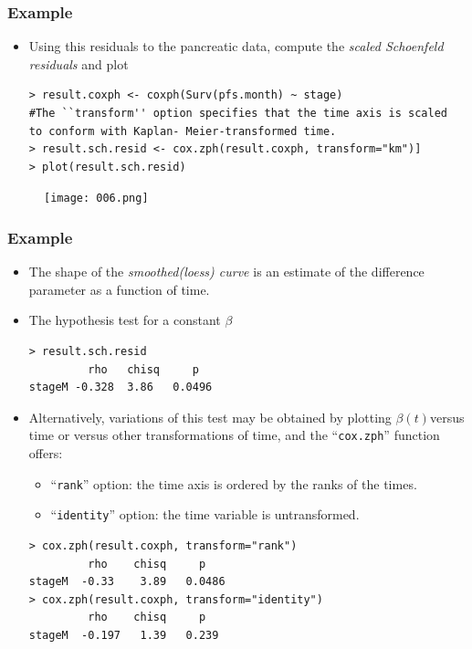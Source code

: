 \documentclass{beamer}
\newcommand{\empr}[1]{{\emph{\color{red}#1}}}
\begin{document}
\pagebreak
\begin{frame}[fragile]
\frametitle{Example}
\begin{itemize}
\item Using this residuals to the pancreatic data, compute the \empr{scaled Schoenfeld residuals} and plot
\begin{Verbatim}
> result.coxph <- coxph(Surv(pfs.month) ~ stage)
#The ``transform'' option specifies that the time axis is scaled 
to conform with Kaplan- Meier-transformed time.
> result.sch.resid <- cox.zph(result.coxph, transform="km")]
> plot(result.sch.resid)
\end{Verbatim}
\end{itemize}
\begin{figure}
	\texttt{[image: 006.png]}
\end{figure}
\end{frame}

\pagebreak
\begin{frame}[fragile]
\frametitle{Example}
\begin{itemize}
\item The shape of the \empr{smoothed(loess) curve} is an estimate of the difference parameter as a function of time.
\item The hypothesis test for a constant $\beta$
\begin{Verbatim}
> result.sch.resid
         rho   chisq     p
stageM -0.328  3.86   0.0496
\end{Verbatim}
\item Alternatively, variations of this test may be obtained by plotting $\beta(t)$versus time or versus other transformations of time, and the ``\texttt{cox.zph}'' function offers:
\begin{itemize}
\item ``\texttt{rank}'' option: the time axis is ordered by the ranks of the times.
\item ``\texttt{identity}'' option: the time variable is untransformed.
\end{itemize}
\begin{Verbatim}
> cox.zph(result.coxph, transform="rank")
         rho    chisq     p
stageM  -0.33    3.89   0.0486
> cox.zph(result.coxph, transform="identity")
         rho    chisq     p
stageM  -0.197   1.39   0.239
\end{Verbatim}
\end{itemize}
\end{frame}
\end{document}
